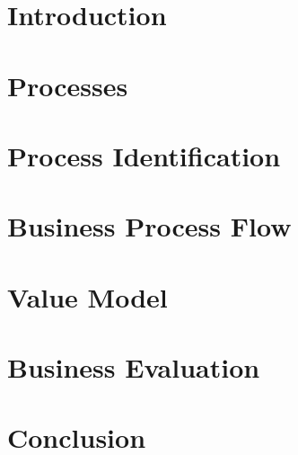 \newpage
\tableofcontents
\newpage

\section{Introduction}


\newpage
\section{Processes}


\newpage
\section{Process Identification}


\newpage
\section{Business Process Flow}


\newpage
\section{Value Model}


\newpage
\section{Business Evaluation}


\newpage
\section{Conclusion}

